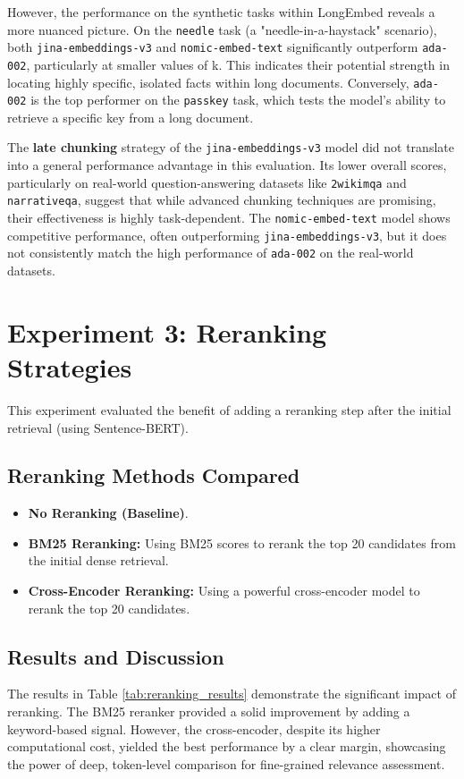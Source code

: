 However, the performance on the synthetic tasks within LongEmbed reveals a more nuanced picture. On the \texttt{needle} task (a "needle-in-a-haystack" scenario), both \texttt{jina-embeddings-v3} and \texttt{nomic-embed-text} significantly outperform \texttt{ada-002}, particularly at smaller values of k. This indicates their potential strength in locating highly specific, isolated facts within long documents. Conversely, \texttt{ada-002} is the top performer on the \texttt{passkey} task, which tests the model's ability to retrieve a specific key from a long document.

The \textbf{late chunking} strategy of the \texttt{jina-embeddings-v3} model did not translate into a general performance advantage in this evaluation. Its lower overall scores, particularly on real-world question-answering datasets like \texttt{2wikimqa} and \texttt{narrativeqa}, suggest that while advanced chunking techniques are promising, their effectiveness is highly task-dependent. The \texttt{nomic-embed-text} model shows competitive performance, often outperforming \texttt{jina-embeddings-v3}, but it does not consistently match the high performance of \texttt{ada-002} on the real-world datasets.

\section{Experiment 3: Reranking Strategies}
\label{sec:exp_reranking}
This experiment evaluated the benefit of adding a reranking step after the initial retrieval (using Sentence-BERT).
\subsection{Reranking Methods Compared}
\begin{itemize}
    \item \textbf{No Reranking (Baseline)}.
    \item \textbf{BM25 Reranking:} Using BM25 scores to rerank the top 20 candidates from the initial dense retrieval.
    \item \textbf{Cross-Encoder Reranking:} Using a powerful cross-encoder model to rerank the top 20 candidates.
\end{itemize}
\subsection{Results and Discussion}
The results in Table \ref{tab:reranking_results} demonstrate the significant impact of reranking. The BM25 reranker provided a solid improvement by adding a keyword-based signal. However, the cross-encoder, despite its higher computational cost, yielded the best performance by a clear margin, showcasing the power of deep, token-level comparison for fine-grained relevance assessment.

